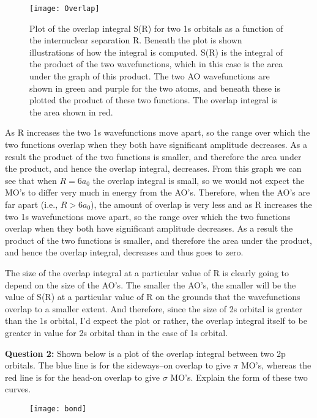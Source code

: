 \documentclass[12pt]{article}
\begin{document}
	\begin{figure}[H]
		\centering
		\texttt{[image: Overlap]}
		\caption{Plot of the overlap integral S(R) for two 1s orbitals as a function of the internuclear
			separation R. Beneath the plot is shown illustrations of how the integral is computed. S(R) is
			the integral of the product of the two wavefunctions, which in this case is the area under the graph
			of this product. The two AO wavefunctions are shown in green and purple for the two atoms, and
			beneath these is plotted the product of these two functions. The overlap integral is the area shown
			in red.}
		\label{figure:overlap}
	\end{figure}
	
	As R increases the two 1s wavefunctions move apart, so the range over which the two functions overlap when they both have significant amplitude decreases. As a result the product of the two functions is smaller, and therefore the area under the product, and hence the overlap integral, decreases. From this graph we can see that when $R = 6a_{0}$ the overlap integral is small, so we would not expect the MO's to differ very much in energy from the AO's. Therefore, when the AO's are far apart (i.e., $R > 6a_{0}$), the amount of overlap is very less and as R increases the two 1s wavefunctions move apart, so the range over which the two functions overlap when they both have significant amplitude decreases.
	As a result the product of the two functions is smaller, and therefore the area under the product, and hence the overlap integral, decreases and thus goes to zero.
	
	The size of the overlap integral at a particular value of R is clearly going to depend on the size of the AO's. The smaller the AO's, the smaller will be the value of S(R) at a particular value of R on the grounds that the wavefunctions overlap to a smaller extent. And therefore, since  the size of 2s orbital is greater than the 1s orbital, I'd expect the plot or rather, the overlap integral itself to be greater in value for 2s orbital than in the case of 1s orbital.
	
	\pagebreak
	
	\textbf{Question 2: }Shown below is a plot of the overlap integral between two 2p orbitals. The blue line is for 
	the sideways–on overlap to give $\pi$ MO’s, whereas the red line is for the head-on overlap to give $\sigma$ MO’s. Explain the form of these two curves.
	
		\begin{figure}[H]
		\centering
		\texttt{[image: bond]}
		\caption{}
		\label{figure:Q2}
	\end{figure}
\end{document}

